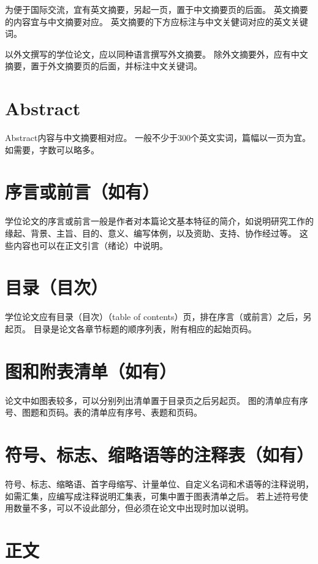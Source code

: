 为便于国际交流，宜有英文摘要，另起一页，置于中文摘要页的后面。
英文摘要的内容宜与中文摘要对应。
英文摘要的下方应标注与中文关健词对应的英文关键词。

以外文撰写的学位论文，应以同种语言撰写外文摘要。
除外文摘要外，应有中文摘要，置于外文摘要页的后面，并标注中文关键词。

\section{Abstract}

Abstract内容与中文摘要相对应。
一般不少于300个英文实词，篇幅以一页为宜。
如需要，字数可以略多。

\section{序言或前言（如有）}

学位论文的序言或前言一般是作者对本篇论文基本特征的简介，如说明研究工作的缘起、背景、主旨、目的、意义、编写体例，以及资助、支持、协作经过等。
这些内容也可以在正文引言（绪论）中说明。

\section{目录（目次）}

学位论文应有目录（目次）（table of contents）页，排在序言（或前言）之后，另起页。
目录是论文各章节标题的顺序列表，附有相应的起始页码。

\section{图和附表清单（如有）}

论文中如图表较多，可以分别列出清单置于目录页之后另起页。
图的清单应有序号、图题和页码。表的清单应有序号、表题和页码。

\section{符号、标志、缩略语等的注释表（如有）}

符号、标志、缩略语、首字母缩写、计量单位、自定义名词和术语等的注释说明，如需汇集，应编写成注释说明汇集表，可集中置于图表清单之后。
若上述符号使用数量不多，可以不设此部分，但必须在论文中出现时加以说明。

\section{正文}

